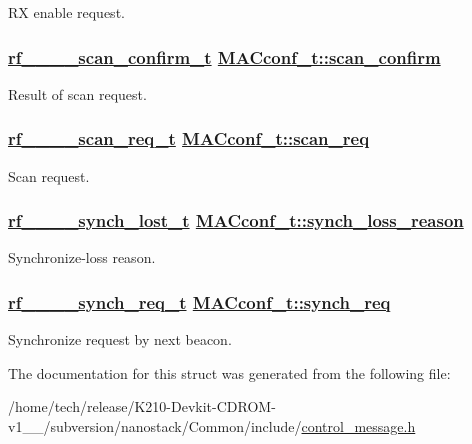 RX enable request. \hypertarget{structMACconf__t_e9b07a3ac6318d15eed2e166c751a712}{
\subsubsection[scan\_\-confirm]{\setlength{\rightskip}{0pt plus 5cm}\hyperlink{structrf__802__15__4__scan__confirm__t}{rf\_\_\_\_\-scan\_\-confirm\_\-t} \hyperlink{structMACconf__t_e9b07a3ac6318d15eed2e166c751a712}{MACconf\_\-t::scan\_\-confirm}}}
\label{structMACconf__t_e9b07a3ac6318d15eed2e166c751a712}


Result of scan request. \hypertarget{structMACconf__t_73ddbc4883498f43868b76256fabc951}{
\subsubsection[scan\_\-req]{\setlength{\rightskip}{0pt plus 5cm}\hyperlink{structrf__802__15__4__scan__req__t}{rf\_\_\_\_\-scan\_\-req\_\-t} \hyperlink{structMACconf__t_73ddbc4883498f43868b76256fabc951}{MACconf\_\-t::scan\_\-req}}}
\label{structMACconf__t_73ddbc4883498f43868b76256fabc951}


Scan request. \hypertarget{structMACconf__t_1e2659ba9ca3c9393ed0b6b4b4b095ec}{
\subsubsection[synch\_\-loss\_\-reason]{\setlength{\rightskip}{0pt plus 5cm}\hyperlink{structrf__802__15__4__synch__lost__t}{rf\_\_\_\_\-synch\_\-lost\_\-t} \hyperlink{structMACconf__t_1e2659ba9ca3c9393ed0b6b4b4b095ec}{MACconf\_\-t::synch\_\-loss\_\-reason}}}
\label{structMACconf__t_1e2659ba9ca3c9393ed0b6b4b4b095ec}


Synchronize-loss reason. \hypertarget{structMACconf__t_52c0778c38fbd508c85c73b6843c34df}{
\subsubsection[synch\_\-req]{\setlength{\rightskip}{0pt plus 5cm}\hyperlink{structrf__802__15__4__synch__req__t}{rf\_\_\_\_\-synch\_\-req\_\-t} \hyperlink{structMACconf__t_52c0778c38fbd508c85c73b6843c34df}{MACconf\_\-t::synch\_\-req}}}
\label{structMACconf__t_52c0778c38fbd508c85c73b6843c34df}


Synchronize request by next beacon. 

The documentation for this struct was generated from the following file:\begin{CompactItemize}
\item 
/home/tech/release/K210-Devkit-CDROM-v1\_\_/subversion/nanostack/Common/include/\hyperlink{control__message_8h}{control\_\-message.h}\end{CompactItemize}
